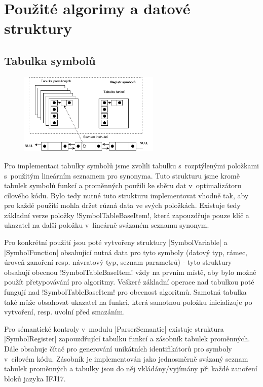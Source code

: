 \section{Použité algorimy a datové struktury}

\subsection{Tabulka symbolů}

\begin{figure}[htbp]
    \centering
    \includegraphics[width=0.6\textwidth, angle=0]{src/assets/symbol_table.pdf}
\end{figure}

Pro implementaci tabulky symbolů jsme zvolili tabulku s~rozptýlenými položkami s~použitým lineárním seznamem pro synonyma.
Tuto strukturu jsme kromě tabulek symbolů funkcí a proměnných použili ke sběru dat v~optimalizátoru cílového kódu. Bylo tedy nutné tuto strukturu implementovat vhodně tak, aby pro každé použití mohla držet různá data ve svých položkách. Existuje tedy základní verze položky \ic!SymbolTableBaseItem!, která zapouzdřuje pouze klíč a ukazatel na další položku v~lineárně svázaném seznamu synonym.

Pro konkrétní použití jsou poté vytvořeny struktury \ic|SymbolVariable| a \ic|SymbolFunction| obsahující nutná data pro tyto symboly (datový typ, rámec, úroveň zanoření resp. návratový typ, seznam parametrů) - tyto struktury obsahují obecnou \ic!SymbolTableBaseItem! vždy na prvním místě, aby bylo možné použít přetypovávání pro algoritmy. Veškeré základní operace nad tabulkou poté fungují nad \ic!SymbolTableBaseItem! pro obecnost algoritmů. Samotná tabulka také může obsahovat ukazatel na funkci, která samotnou položku inicializuje po vytvoření, resp. uvolní před smazáním.

Pro sémantické kontroly v~modulu \ic|ParserSemantic| existuje struktura \ic|SymbolRegister| zapouzdřující tabulku funkcí a zásobník tabulek proměnných. Dále obsahuje čítač pro generování unikátních identifikátorů pro symboly v~cílovém kódu. Zásobník je implementován jako jednosměrně svázaný seznam tabulek proměnných a tabulky jsou do něj vkládány/vyjímány při každé zanoření bloků jazyka IFJ17.

